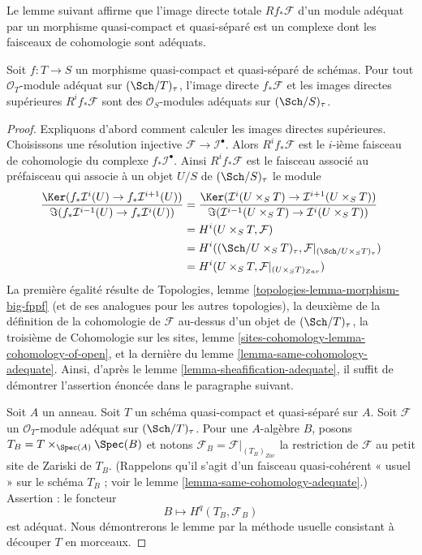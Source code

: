 \noindent
Le lemme suivant affirme que l'image directe totale
$Rf_*\mathcal{F}$ d'un module adéquat par un morphisme quasi-compact et
quasi-séparé est un complexe dont les faisceaux de cohomologie
sont adéquats.

\begin{lemma}
\label{lemma-direct-image-adequate}
Soit $f : T \to S$ un morphisme quasi-compact et quasi-séparé
de schémas. Pour tout $\mathcal{O}_T$-module adéquat sur
$(\Sch/T)_\tau$, l'image directe
$f_*\mathcal{F}$ et les images directes supérieures $R^if_*\mathcal{F}$
sont des $\mathcal{O}_S$-modules adéquats sur $(\Sch/S)_\tau$.
\end{lemma}

\begin{proof}
Expliquons d'abord comment calculer les images directes supérieures.
Choisissons une résolution injective $\mathcal{F} \to \mathcal{I}^\bullet$.
Alors $R^if_*\mathcal{F}$ est le $i$-ième faisceau de cohomologie du
complexe $f_*\mathcal{I}^\bullet$.
Ainsi $R^if_*\mathcal{F}$ est le faisceau associé au préfaisceau
qui associe à un objet $U/S$ de $(\Sch/S)_\tau$
le module
\begin{align*}
\frac{\Ker(f_*\mathcal{I}^i(U) \to f_*\mathcal{I}^{i + 1}(U))}
{\Im(f_*\mathcal{I}^{i - 1}(U) \to f_*\mathcal{I}^i(U))}
& =
\frac{\Ker(\mathcal{I}^i(U \times_S T) \to
\mathcal{I}^{i + 1}(U \times_S T))}
{\Im(\mathcal{I}^{i - 1}(U \times_S T) \to \mathcal{I}^i(U \times_S T))}
\\
& =
H^i(U \times_S T, \mathcal{F}) \\
& = H^i((\Sch/U \times_S T)_\tau,
\mathcal{F}|_{(\Sch/U \times_S T)_\tau}) \\
& = H^i(U \times_S T, \mathcal{F}|_{(U \times_S T)_{Zar}})
\end{align*}
La première égalité résulte de
Topologies, lemme \ref{topologies-lemma-morphism-big-fppf}
(et de ses analogues pour les autres topologies),
la deuxième de la définition de la cohomologie de $\mathcal{F}$
au-dessus d'un objet de $(\Sch/T)_\tau$,
la troisième de
Cohomologie sur les sites, lemme \ref{sites-cohomology-lemma-cohomology-of-open},
et la dernière du
lemme \ref{lemma-same-cohomology-adequate}.
Ainsi, d'après le
lemme \ref{lemma-sheafification-adequate},
il suffit de démontrer l'assertion énoncée dans le paragraphe suivant.

\medskip\noindent
Soit $A$ un anneau. Soit $T$ un schéma quasi-compact et quasi-séparé
sur $A$. Soit $\mathcal{F}$ un $\mathcal{O}_T$-module adéquat sur
$(\Sch/T)_\tau$. Pour une $A$-algèbre $B$, posons
$T_B = T \times_{\Spec(A)} \Spec(B)$ et notons
$\mathcal{F}_B = \mathcal{F}|_{(T_B)_{Zar}}$ la restriction de
$\mathcal{F}$ au petit site de Zariski de $T_B$.
(Rappelons qu'il s'agit d'un faisceau quasi-cohérent « usuel » sur le schéma
$T_B$ ; voir le
lemme \ref{lemma-same-cohomology-adequate}.)
Assertion : le foncteur
$$
B \longmapsto H^q(T_B, \mathcal{F}_B)
$$
est adéquat. Nous démontrerons le lemme par la méthode usuelle
consistant à découper $T$ en morceaux.


\end{proof}
